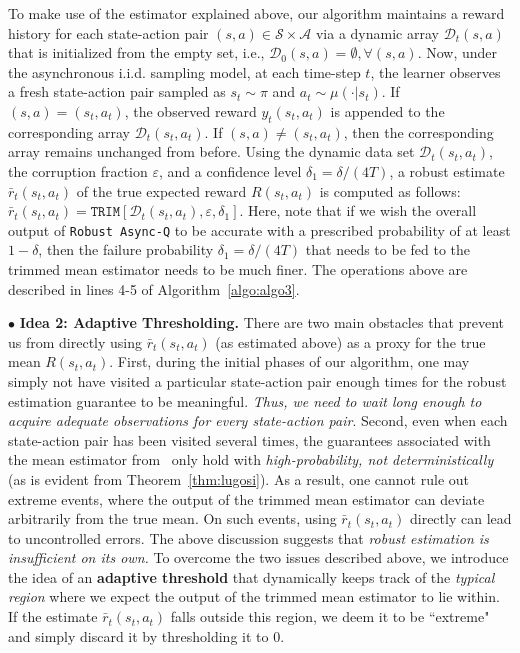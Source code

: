 \documentclass{article}
\newcommand{\mc}{\mathcal}
\begin{document}
To make use of the estimator explained above, our algorithm maintains a reward history for each state-action pair $(s,a) \in \mathcal{S} \times \mathcal{A}$ via a dynamic array $\mc{D}_t(s,a)$ that is initialized from the empty set, i.e., $\mc{D}_0(s,a) = \emptyset, \forall (s,a)$. Now, under the asynchronous i.i.d. sampling model, at each time-step \( t \), the learner observes a fresh state-action pair sampled as \( s_t \sim \pi \) and \( a_t \sim \mu( \cdot | s_t) \). If $(s,a) = (s_t, a_t)$, the observed reward $ y_t(s_t,a_t) $ is appended to the corresponding array $\mc{D}_t(s_t, a_t)$. If $(s,a) \neq (s_t, a_t)$, then the corresponding array remains unchanged from before. Using the dynamic data set $\mc{D}_t(s_t,a_t)$, the corruption fraction $\varepsilon$, and a confidence level \( \delta_1 = \delta / (4T) \), a robust estimate \( \bar{r}_t(s_t, a_t) \) of the true expected reward \( R(s_t, a_t) \) is computed as follows: $\bar{r}_t(s_t, a_t) = \texttt{TRIM}[\mc{D}_t(s_t,a_t), \varepsilon, \delta_1]$. Here, note that if we wish the overall output of \texttt{Robust Async-Q} to be accurate with a prescribed probability of at least $1-\delta$, then the 
failure probability $\delta_1 = \delta/(4T)$ that needs to be fed to the trimmed mean estimator needs to be much finer. The operations above are described in lines 4-5 of Algorithm~\ref{algo:algo3}. 

\noindent $\bullet$ \textbf{Idea 2: Adaptive Thresholding.} There are two main obstacles that prevent us from directly using $\bar{r}_t(s_t, a_t)$ (as estimated above) as a proxy for the true mean $R(s_t, a_t)$. First, during the initial phases of our algorithm, one may simply not have visited a particular state-action pair enough times for the robust estimation guarantee to be meaningful. \emph{Thus, we need to wait long enough to acquire adequate observations for every state-action pair}. Second, even when each state-action pair has been visited several times, the guarantees associated with the mean estimator from~\citet{lugosi} only hold with \emph{high-probability, not deterministically} (as is evident from Theorem~\ref{thm:lugosi}). As a result, one cannot rule out extreme events, where the output of the trimmed mean estimator can deviate arbitrarily from the true mean. On such events, using $\bar{r}_t(s_t, a_t)$ directly can lead to uncontrolled errors. The above discussion suggests that \emph{robust estimation is insufficient on its own.} To overcome the two issues described above, we introduce the idea of an \textbf{adaptive threshold} that dynamically keeps track of the \emph{typical region} where we expect the output of the trimmed mean estimator to lie within. If the estimate $\bar{r}_t(s_t, a_t)$ falls outside this region, we deem it to be ``extreme" and simply discard it by thresholding it to $0$. 
\end{document}
